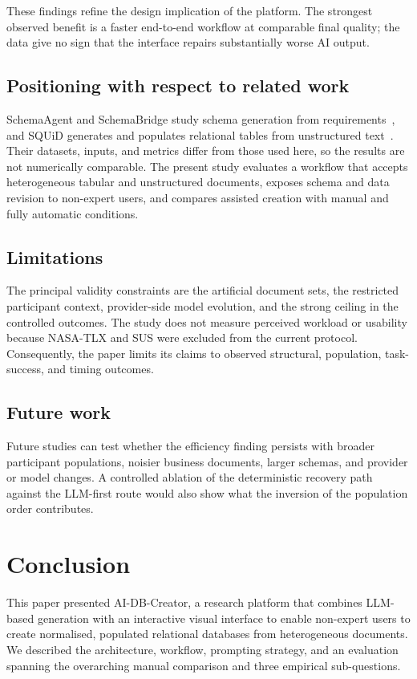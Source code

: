 \documentclass[11pt,a4paper]{article}
\newcommand{\aidb}{AI-DB-Creator}
\begin{document}
These findings refine the design implication of the platform. The strongest
observed benefit is a faster end-to-end workflow at comparable final quality;
the data give no sign that the interface repairs substantially worse AI
output.

\subsection{Positioning with respect to related work}
SchemaAgent and SchemaBridge study schema generation from requirements~\citep{wang2025schemaagent,chakrabarti2026schemabridge}, and SQUiD generates and populates relational tables from unstructured text~\citep{sadia2025squid}. Their datasets, inputs, and metrics differ from those used here, so the results are not numerically comparable. The present study evaluates a workflow that accepts heterogeneous tabular and unstructured documents, exposes schema and data revision to non-expert users, and compares assisted creation with manual and fully automatic conditions.

\subsection{Limitations}
The principal validity constraints are the artificial document sets, the
restricted participant context, provider-side model evolution, and the strong
ceiling in the controlled outcomes. The study does not measure perceived
workload or usability because NASA-TLX and SUS were excluded from the current
protocol. Consequently, the paper limits its claims to observed structural,
population, task-success, and timing outcomes.

\subsection{Future work}
Future studies can test whether the efficiency finding persists with broader participant populations, noisier business documents, larger schemas, and provider or model changes. A controlled ablation of the deterministic recovery path against the LLM-first route would also show what the inversion of the population order contributes.

\section{Conclusion}
\label{sec:conclusion}
This paper presented \aidb, a research platform that combines LLM-based generation with an interactive visual interface to enable non-expert users to create normalised, populated relational databases from heterogeneous documents. We described the architecture, workflow, prompting strategy, and an evaluation spanning the overarching manual comparison and three empirical sub-questions.
\end{document}
